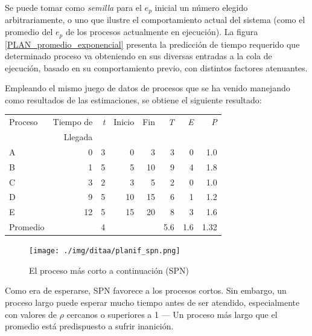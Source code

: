 \documentclass[11pt,fleqn]{book} %
\begin{document}
Se puede tomar como \emph{semilla} para el $e_p$ inicial un número elegido
arbitrariamente, o uno que ilustre el comportamiento actual del
sistema (como el promedio del $e_p$ de los procesos actualmente en
ejecución). La figura \ref{PLAN_promedio_exponencial} presenta la
predicción de tiempo requerido que determinado proceso va obteniendo
en sus diversas entradas a la cola de ejecución, basado en su
comportamiento previo, con distintos factores atenuantes.

Empleando el mismo juego de datos de procesos que se ha venido
manejando como resultados de las estimaciones, se obtiene el
siguiente resultado:


\begin{center}
\begin{tabular}{lrrrrrrr}
 Proceso   &  Tiempo de  &  \emph{t}  &  Inicio  &  Fin  &  \emph{T}  &  \emph{E}  &  \emph{P}  \\
           &    Llegada  &            &          &       &            &            &            \\
\hline
 A         &          0  &         3  &       0  &    3  &         3  &         0  &       1.0  \\
 B         &          1  &         5  &       5  &   10  &         9  &         4  &       1.8  \\
 C         &          3  &         2  &       3  &    5  &         2  &         0  &       1.0  \\
 D         &          9  &         5  &      10  &   15  &         6  &         1  &       1.2  \\
 E         &         12  &         5  &      15  &   20  &         8  &         3  &       1.6  \\
\hline
 Promedio  &             &         4  &          &       &       5.6  &       1.6  &      1.32  \\
\end{tabular}
\end{center}



\begin{figure}[htb]
\centering
\texttt{[image: ./img/ditaa/planif\_spn.png]}
\caption{\label{PLAN_planif_spn}El proceso más corto a continuación (SPN)}
\end{figure}

Como era de esperarse, SPN favorece a los procesos cortos. Sin
embargo, un proceso largo puede esperar mucho tiempo antes de ser
atendido, especialmente con valores de $\rho$ cercanos o superiores a
1 — Un proceso más largo que el promedio está predispuesto a sufrir
inanición.
\end{document}
